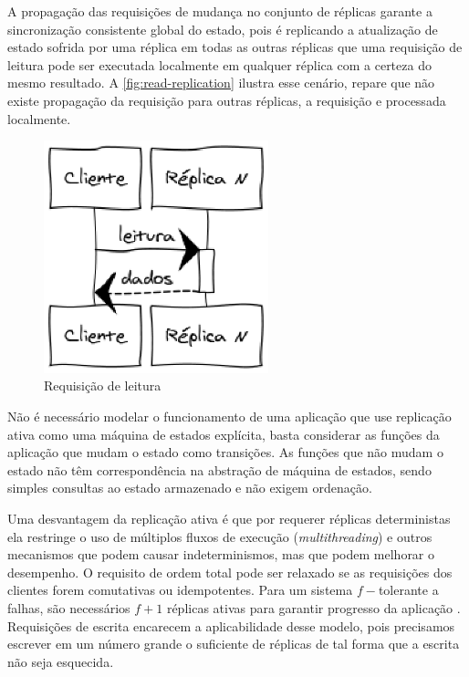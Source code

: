A propagação das requisições de mudança no conjunto de réplicas garante a sincronização
consistente global do estado, pois é replicando a atualização de estado sofrida por uma
réplica em todas as outras réplicas que uma requisição de leitura pode ser executada
localmente em qualquer réplica com a certeza do mesmo resultado. A
\autoref{fig:read-replication} ilustra esse cenário, repare que não existe propagação da
requisição para outras réplicas, a requisição e processada localmente.

\begin{figure}[htbp]
  \centering
  \includegraphics[width=6.5cm]{conteudo/capitulos/figuras/leitura_replicacao.eps}
  \caption{Requisição de leitura}
  \label{fig:read-replication}
\end{figure}

Não é necessário modelar o funcionamento de uma aplicação que use replicação ativa como
uma máquina de estados explícita, basta considerar as funções da aplicação que mudam o
estado como transições. As funções que não mudam o estado não têm correspondência na
abstração de máquina de estados, sendo simples consultas ao estado armazenado e não exigem
ordenação.

Uma desvantagem da replicação ativa é que por requerer réplicas deterministas ela
restringe o uso de múltiplos fluxos de execução (\emph{multithreading}) e outros
mecanismos que podem causar indeterminismos, mas que podem melhorar o desempenho. O
requisito de ordem total pode ser relaxado se as requisições dos clientes forem
comutativas ou idempotentes. Para um sistema $f-$tolerante a falhas, são necessários $f +
1$ réplicas ativas para garantir progresso da aplicação \cite{jalote94, lamport10}.
Requisições de escrita encarecem a aplicabilidade desse modelo, pois precisamos escrever
em um número grande o suficiente de réplicas de tal forma que a escrita não seja
esquecida.


